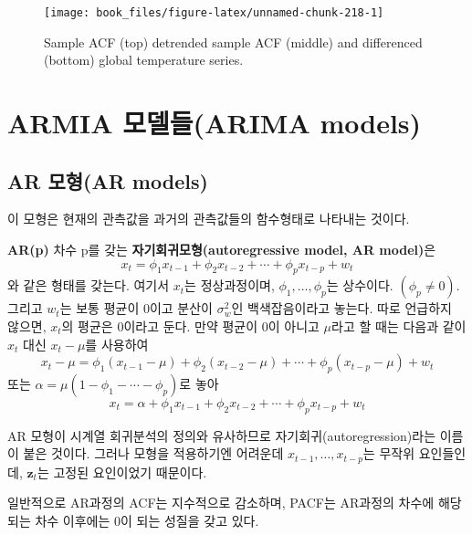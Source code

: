 \documentclass[b5paper,]{scrbook}
\theoremstyle{plain}
\theoremstyle{definition}
\numberwithin{equation}{section}
\let\BeginKnitrBlock\begin \let\EndKnitrBlock\end
\begin{document}
\begin{figure}

{\centering \texttt{[image: book\_files/figure-latex/unnamed-chunk-218-1]} 

}

\caption{Sample ACF (top) detrended sample ACF (middle) and differenced (bottom) global temperature series.}\label{fig:unnamed-chunk-218}
\end{figure}

\hypertarget{armia-arima-models}{%
\section{ARMIA 모델들(ARIMA models)}\label{armia-arima-models}}

\hypertarget{ar-ar-models}{%
\subsection{AR 모형(AR models)}\label{ar-ar-models}}

이 모형은 현재의 관측값을 과거의 관측값들의 함수형태로 나타내는 것이다.

\BeginKnitrBlock{definition}[자기회귀모형]
\protect\hypertarget{def:unnamed-chunk-219}{}{\label{def:unnamed-chunk-219} {} }\textbf{AR(p)} 차수 p를 갖는 \textbf{자기회귀모형(autoregressive model, AR model)}은
\[x_{t}=\phi_{1}x_{t-1}+\phi_{2}x_{t-2} + \cdots + \phi_{p}x_{t-p}+w_{t}\]
와 같은 형태를 갖는다. 여기서 \(x_{t}\)는 정상과정이며, \(\phi_{1},\ldots , \phi_{p}\)는 상수이다. \((\phi_{p}\neq 0)\). 그리고 \(w_{t}\)는 보통 평균이 0이고 분산이 \(\sigma_{w}^{2}\)인 백색잡음이라고 놓는다. 따로 언급하지 않으면, \(x_{t}\)의 평균은 0이라고 둔다. 만약 평균이 0이 아니고 \(\mu\)라고 할 때는 다음과 같이 \(x_{t}\) 대신 \(x_{t}-\mu\)를 사용하여
\[x_{t}-\mu = \phi_{1}(x_{t-1}-\mu)+\phi_{2}(x_{t-2}-\mu) + \cdots + \phi_{p}(x_{t-p}-\mu)+w_{t}\]
또는 \(\alpha=\mu(1-\phi_{1}-\cdots - \phi_{p})\)로 놓아
\[x_{t}=\alpha + \phi_{1}x_{t-1}+\phi_{2}x_{t-2} + \cdots + \phi_{p}x_{t-p}+w_{t}\]
\EndKnitrBlock{definition}

AR 모형이 시계열 회귀분석의 정의와 유사하므로 자기회귀(autoregression)라는 이름이 붙은 것이다. 그러나 모형을 적용하기엔 어려운데 \(x_{t-1}, \ldots, x_{t-p}\)는 무작위 요인들인데, \(\mathbf{z}_{t}\)는 고정된 요인이었기 때문이다.

일반적으로 AR과정의 ACF는 지수적으로 감소하며, PACF는 AR과정의 차수에 해당되는 차수 이후에는 0이 되는 성질을 갖고 있다.
\end{document}
